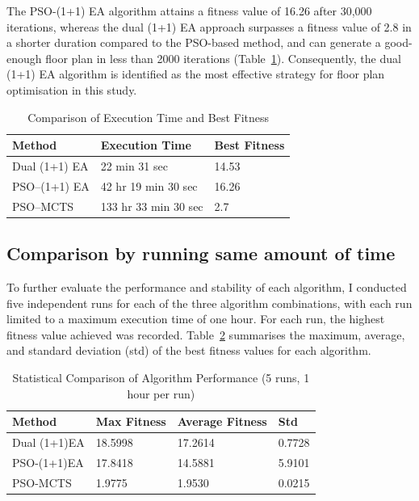 \documentclass[]{article}
\begin{document}
The PSO-(1+1) EA algorithm attains a fitness value of 16.26 after 30,000 iterations, whereas the dual (1+1) EA approach surpasses a fitness value of 2.8 in a shorter duration compared to the PSO-based method, and can generate a good-enough floor plan in less than 2000 iterations (Table~\ref{tab:algorithm_comparison}). Consequently, the dual (1+1) EA algorithm is identified as the most effective strategy for floor plan optimisation in this study.
\begin{table}[h]
    \centering
    \caption{Comparison of Execution Time and Best Fitness}
    \label{tab:algorithm_comparison}
    \begin{tabularx}{\textwidth}{l | l | l}
        \hline
        \textbf{Method} & \textbf{Execution Time} & \textbf{Best Fitness} \\
        \hline
        Dual (1+1) EA   & 22 min 31 sec           & 14.53                 \\
        PSO--(1+1) EA   & 42 hr 19 min 30 sec     & 16.26                 \\
        PSO--MCTS       & 133 hr 33 min 30 sec    & 2.7                   \\
        \hline
    \end{tabularx}
\end{table}

\subsection{Comparison by running same amount of time}
To further evaluate the performance and stability of each algorithm, I conducted five independent runs for each of the three algorithm combinations, with each run limited to a maximum execution time of one hour. For each run, the highest fitness value achieved was recorded. Table~\ref{tab:statistical_comparison} summarises the maximum, average, and standard deviation (std) of the best fitness values for each algorithm.

\begin{table}[h]
    \centering
    \caption{Statistical Comparison of Algorithm Performance (5 runs, 1 hour per run)}
    \label{tab:statistical_comparison}
    \begin{tabularx}{\textwidth}{l | l | l | l}
        \hline
        \textbf{Method} & \textbf{Max Fitness} & \textbf{Average Fitness} & \textbf{Std} \\
        \hline
        Dual (1+1)EA    & 18.5998              & 17.2614                  & 0.7728       \\
        PSO-(1+1)EA     & 17.8418              & 14.5881                  & 5.9101       \\
        PSO-MCTS        & 1.9775               & 1.9530                   & 0.0215       \\
        \hline
    \end{tabularx}
\end{table}
\end{document}
